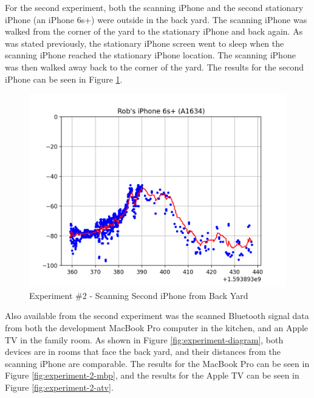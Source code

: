 \documentclass[12pt]{article}
\begin{document}
For the second experiment, both the scanning iPhone and the second stationary iPhone
(an iPhone 6s+) were outside in the back yard. The scanning iPhone was walked from the
corner of the yard to the stationary iPhone and back again. As was stated previously,
the stationary iPhone screen went to sleep when the scanning iPhone reached the stationary
iPhone location. The scanning iPhone was then walked away back to the corner of the yard.
The results for the second iPhone can be seen in Figure \ref{fig:experiment-2-iphone}.

\begin{figure}[ht]
    \centering
    \includegraphics[width=1.0\textwidth]{Experiment-2-iPhone-GM.png}
    \caption{Experiment \#2 - Scanning Second iPhone from Back Yard}
    \label{fig:experiment-2-iphone}
\end{figure}

Also available from the second experiment was the scanned Bluetooth signal data from both
the development MacBook Pro computer in the kitchen, and an Apple TV in the family room.
As shown in Figure \ref{fig:experiment-diagram}, both devices are in rooms that face the
back yard, and their distances from the scanning iPhone are comparable. The results for
the MacBook Pro can be seen in Figure \ref{fig:experiment-2-mbp}, and the results for the
Apple TV can be seen in Figure \ref{fig:experiment-2-atv}.
\end{document}
